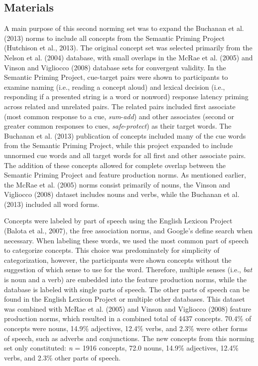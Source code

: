 \documentclass[english,,man]{apa6}
\theoremstyle{definition}
\theoremstyle{definition}
\theoremstyle{definition}
\theoremstyle{remark}
\begin{document}
\hypertarget{materials}{%
\subsection{Materials}\label{materials}}

A main purpose of this second norming set was to expand the Buchanan et
al. (2013) norms to include all concepts from the Semantic Priming
Project (Hutchison et al., 2013). The original concept set was selected
primarily from the Nelson et al. (2004) database, with small overlaps in
the McRae et al. (2005) and Vinson and Vigliocco (2008) database sets
for convergent validity. In the Semantic Priming Project, cue-target
pairs were shown to participants to examine naming (i.e., reading a
concept aloud) and lexical decision (i.e., responding if a presented
string is a word or nonword) response latency priming across related and
unrelated pairs. The related pairs included first associate (most common
response to a cue, \emph{sum}-\emph{add}) and other associates (second
or greater common responses to cues, \emph{safe}-\emph{protect}) as
their target words. The Buchanan et al. (2013) publication of concepts
included many of the cue words from the Semantic Priming Project, while
this project expanded to include unnormed cue words and all target words
for all first and other associate pairs. The addition of these concepts
allowed for complete overlap between the Semantic Priming Project and
feature production norms. As mentioned earlier, the McRae et al. (2005)
norms consist primarily of nouns, the Vinson and Vigliocco (2008)
dataset includes nouns and verbs, while the Buchanan et al. (2013)
included all word forms.

Concepts were labeled by part of speech using the English Lexicon
Project (Balota et al., 2007), the free association norms, and Google's
define search when necessary. When labeling these words, we used the
most common part of speech to categorize concepts. This choice was
predominately for simplicity of categorization, however, the
participants were shown concepts without the suggestion of which sense
to use for the word. Therefore, multiple senses (i.e., \emph{bat} is
noun and a verb) are embedded into the feature production norms, while
the database is labeled with single parts of speech. The other parts of
speech can be found in the English Lexicon Project or multiple other
databases. This dataset was combined with McRae et al. (2005) and Vinson
and Vigliocco (2008) feature production norms, which resulted in a
combined total of 4437 concepts. 70.4\% of concepts were nouns, 14.9\%
adjectives, 12.4\% verbs, and 2.3\% were other forms of speech, such as
adverbs and conjunctions. The new concepts from this norming set only
constituted: \emph{n} = 1916 concepts, 72.0 nouns, 14.9\% adjectives,
12.4\% verbs, and 2.3\% other parts of speech.
\end{document}
